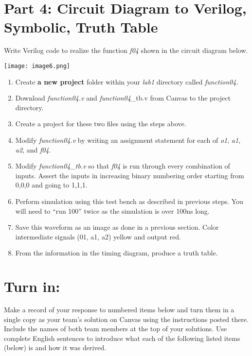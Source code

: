 \hypertarget{part-4-circuit-diagram-to-verilog-symbolic-truth-table}{%
\section{Part 4: Circuit Diagram to Verilog, Symbolic, Truth Table}
\label{part-4-circuit-diagram-to-verilog-symbolic-truth-table}}

Write Verilog code to realize the function \emph{f04} shown in the
circuit diagram below.

\texttt{[image: image6.png]}

\begin{enumerate}
\def\labelenumi{\arabic{enumi}.}
\item
  Create \textbf{a new project} folder within your \emph{lab1} directory
  called \emph{function04.}
\item
  Download \emph{function04.v} and \emph{function04}\_tb.v from Canvas
  to the project directory.
\item
  Create a project for these two files using the steps above.
\item
  \protect\hypertarget{Part_4_Step_4}{}{}Modify \emph{function04.v} by
  writing an assignment statement for each of \emph{o1}, \emph{a1},
  \emph{a2}, and \emph{f04}.
\item
  Modify \emph{function04\_tb.v} so that \emph{f04} is run through every
  combination of inputs. Assert the inputs in increasing binary
  numbering order starting from 0,0,0 and going to 1,1,1.
\item
  Perform simulation using this test bench as described in previous
  steps. You will need to ``run 100'' twice as the simulation is over
  100ns long.
\item
  \protect\hypertarget{Part_4_Step_7}{}{}Save this waveform as an image
  as done in a previous section. Color intermediate signals (01, a1, a2)
  yellow and output red.
\item
  \protect\hypertarget{Part_4_Step_8}{}{}From the information in the
  timing diagram, produce a truth table.
\end{enumerate}

\hypertarget{turn-in}{%
\section{Turn in:}
\label{turn-in}}

Make a record of your response to numbered items below and turn them in
a single copy as your team's solution on Canvas using the instructions
posted there. Include the names of both team members at the top of your
solutions. Use complete English sentences to introduce what each of the
following listed items (below) is and how it was derived.

